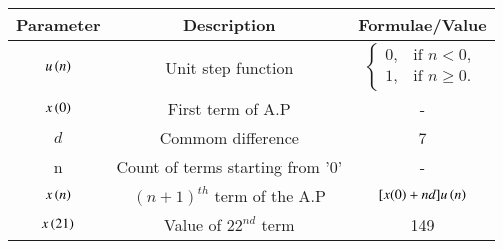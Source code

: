 \renewcommand{\arraystretch}{2}
\begin{tabular}{|c|c|c|}
\hline 
\setlength{\tabcolsep}{1pt}
\textbf{Parameter}  &\textbf{Description} &\textbf{Formulae/Value} \\
\hline
$u\left(n\right)$ & Unit step function & $\begin{cases}
0, & \text{if } n < 0, \\
1, & \text{if } n \geq 0.
\end{cases}$\\
\hline
$x\left(0\right)$ & First term of A.P & - \\
\hline
\textbf{$d$} & Commom difference & 7 \\
\hline
n & Count of terms starting from '0' & - \\
\hline
$x\left(n\right)$ & $(n+1)^{th}$ term of the A.P & $[x(0)+nd]u\left(n\right)$ \\
\hline
$x\left(21\right)$ & Value of $22^{nd}$ term & 149 \\

\hline

\end{tabular}
